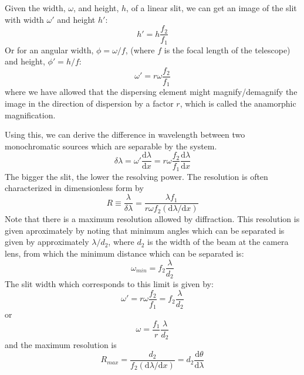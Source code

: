 \documentclass[12pt]{article}
\begin{document}
Given the width, $\omega$, and height, $h$, of a linear slit,
we can get an image of the slit with width $\omega'$ and
height $h'$:
\[
    h' = h\frac{f_{2}}{f_{1}}
    \]
Or for an angular width, $\phi = \omega/f$,
(where $f$ is the focal length of the telescope) and height,
$\phi' = h/f$:
\[
\omega' = r\omega\frac{f_{2}}{f_{1}}
    \]
where we have allowed that the dispersing element might
magnify/demagnify the image in the direction of dispersion by a factor
$r$, which is called the anamorphic magnification.

Using this, we can derive the difference in wavelength between two
monochromatic sources which are separable by the system.
\[
    \delta\lambda
    = \omega'\frac{\textrm{d}\lambda}{\textrm{d}x}
    = r\omega\frac{f_{2}}{f_{1}}\frac{\textrm{d}\lambda}{\textrm{d}x}
    \]
The bigger the slit, the lower the resolving power.
The resolution is often characterized in dimensionless form by
\[
    R \equiv \frac{\lambda}{\delta\lambda} =
    \frac{\lambda{f_{1}}}{r\omega{f_{2}}\left(
    \textrm{d}\lambda/\textrm{d}x\right)}
        \]
Note that there is a maximum resolution allowed by diffraction. This resolution
is given aproximately by noting that minimum angles which can be separated is
given by approximately $\lambda/d_{2}$, where $d_{2}$ is the width of the beam
at the camera lens, from which the minimum distance which can be separated is:
\[
    \omega_{min} = f_{2}\frac{\lambda}{d_{2}}
    \]
The slit width which corresponds to this limit is given by:
\[
    \omega' = r\omega\frac{f_{2}}{f_{1}} = f_{2}\frac{\lambda}{d_{2}}
    \]
or
\[
    \omega = \frac{f_{1}}{r}\frac{\lambda}{d_{2}}
    \]
and the maximum resolution is
\[
    R_{max} =
    \frac{d_{2}}{f_{2}\left(\mathrm{d}\lambda/\mathrm{d}x\right)} =
    d_{2}\frac{\mathrm{d}\theta}{\mathrm{d}\lambda}
    \]
\end{document}
